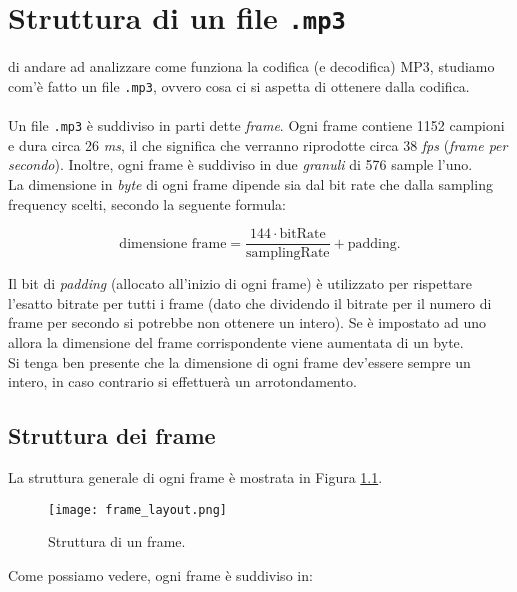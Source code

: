 \chapter{Struttura di un file \texttt{.mp3}} \label{chap:struttura_file_mp3}
	
	 di andare ad analizzare come funziona la codifica (e decodifica) MP3, studiamo com'è fatto un file \texttt{.mp3}, ovvero cosa ci si aspetta di ottenere dalla codifica.\\
	\\
	Un file \texttt{.mp3} è suddiviso in parti dette \textit{frame}. Ogni frame contiene 1152 campioni e dura circa 26 \textit{ms}, il che significa che verranno riprodotte circa 38 \textit{fps} (\textit{frame per secondo}). Inoltre, ogni frame è suddiviso in due \textit{granuli} di 576 sample l'uno.\\
	La dimensione in \textit{byte} di ogni frame dipende sia dal bit rate che dalla sampling frequency scelti, secondo la seguente formula:
	
	\begin{equation} \label{eqn:dimensione_frame}
		\mbox{dimensione frame}=\frac{144\cdot\mbox{bitRate}}{\mbox{samplingRate}}+\mbox{padding}.
	\end{equation}
	
	Il bit di \textit{padding} (allocato all'inizio di ogni frame) è utilizzato per rispettare l'esatto bitrate per tutti i frame (dato che dividendo il bitrate per il numero di frame per secondo si potrebbe non ottenere un intero). Se è impostato ad uno allora la dimensione del frame corrispondente viene aumentata di un byte.\\
	Si tenga ben presente che la dimensione di ogni frame dev'essere sempre un intero, in caso contrario si effettuerà un arrotondamento.
	
	\section{Struttura dei frame} \label{sec:struttura_frame}
		
		La struttura generale di ogni frame è mostrata in Figura \ref{fig:frame_layout}.
		
		\begin{figure}[h!]
			\centering
				\texttt{[image: frame\_layout.png]}
			\caption{Struttura di un frame.}
			\label{fig:frame_layout}
		\end{figure}
		
		Come possiamo vedere, ogni frame è suddiviso in:
		
